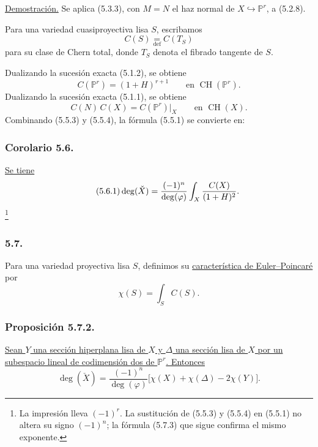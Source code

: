 \noindent\underline{Demostración.}
Se aplica (5.3.3), con $M=N$ el haz normal de
$X\hookrightarrow\mathbb P^r$, a (5.2.8).

Para una variedad cuasiproyectiva lisa $S$, escribamos
\begin{equation}\tag{5.5.2}
C(S)\underset{\mathrm{def}}{=}C(T_S)
\end{equation}
para su clase de Chern total, donde $T_S$ denota el fibrado tangente
de $S$.

\pageoriginale

Dualizando la sucesión exacta (5.1.2), se obtiene
\begin{equation}\tag{5.5.3}
C(\mathbb P^r)=(1+H)^{r+1}
\qquad\text{en }\operatorname{CH}(\mathbb P^r).
\end{equation}
Dualizando la sucesión exacta (5.1.1), se obtiene
\begin{equation}\tag{5.5.4}
C(N)\,C(X)=C(\mathbb P^r)|_X
\qquad\text{en }\operatorname{CH}(X).
\end{equation}
Combinando (5.5.3) y (5.5.4), la fórmula (5.5.1) se convierte en:

\subsubsection*{Corolario 5.6.}
\underline{Se tiene}
\begin{equation}\tag{5.6.1}
\deg(\check X)
=\frac{(-1)^{\sisi{r}{n}}}{\deg(\varphi)}
\int_X\frac{C(X)}{(1+H)^2}.
\end{equation}
\footnote{La impresión lleva $(-1)^r$. La sustitución de (5.5.3) y
(5.5.4) en (5.5.1) no altera su signo $(-1)^n$; la fórmula (5.7.3)
que sigue confirma el mismo exponente.}

\subsubsection*{5.7.}
Para una variedad proyectiva lisa $S$, definimos su
\underline{característica de Euler--Poincaré} por
\begin{equation}\tag{5.7.1}
\chi(S)=\int_SC(S).
\end{equation}

\subsubsection*{Proposición 5.7.2.}
\underline{Sean $Y$ una sección hiperplana lisa de $X$ y $\Delta$ una
sección lisa de $X$ por un subespacio lineal de codimensión dos de
$\mathbb P^r$. Entonces}
\begin{equation}\tag{5.7.3}
\deg(\check X)
=\frac{(-1)^n}{\deg(\varphi)}
\bigl[\chi(X)+\chi(\Delta)-2\chi(Y)\bigr].
\end{equation}

